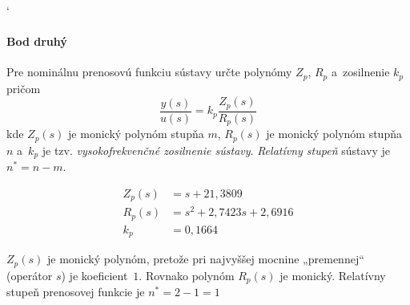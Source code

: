\documentclass[a4paper, 10pt, ]{article}
\begin{document}
{\catcode`

}







\paragraph{Bod druhý}

{\color{gray}

Pre nominálnu prenosovú funkciu sústavy určte polynómy $Z_p$, $R_p$ a~zosilnenie $k_p$ pričom
\begin{equation*}
       \frac{y(s)}{u(s)} = k_p \frac{Z_p(s)}{R_p(s)}
\end{equation*}
kde $Z_p(s)$ je monický  polynóm stupňa $m$, $R_p(s)$ je monický polynóm stupňa $n$ a~$k_p$ je tzv. \emph{vysokofrekvenčné zosilnenie sústavy}. \emph{Relatívny stupeň} sústavy je $n^* = n - m$.

}

\smallskip



\begin{subequations}
    \begin{align}
        Z_p(s) &= s + 21,3809 \\
        R_p(s) &= s^2 + 2,7423 s + 2,6916 \\
        k_p &= 0,1664
    \end{align}
\end{subequations}



$Z_p(s)$ je monický polynóm, pretože pri najvyššej mocnine „premennej“ (operátor $s$) je koeficient~$1$. Rovnako polynóm $R_p(s)$ je monický. Relatívny stupeň prenosovej funkcie je $n^* = 2 - 1 = 1$










\end{document}
